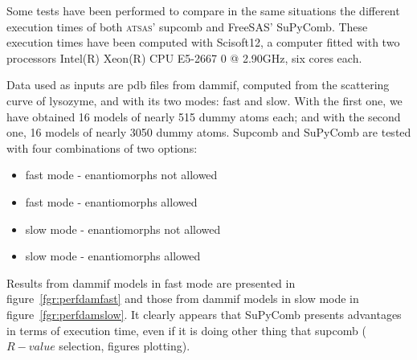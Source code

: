 \documentclass[a4paper, 11pt]{report}
\begin{document}
Some tests have been performed to compare in the same situations the 
different execution times of both \textsc{atsas}' supcomb and FreeSAS' 
SuPyComb. 
These execution times have been computed with Scisoft12, a computer 
fitted with two processors Intel(R) Xeon(R) CPU E5-2667 0 @ 2.90GHz, 
six cores each.

Data used as inputs are pdb files from dammif, computed from the 
scattering curve of lysozyme, and with its two modes: fast and slow. 
With the first one, we have obtained 16 models of nearly 515 dummy 
atoms each; and with the second one, 16 models of nearly 3050 dummy 
atoms. 
Supcomb and SuPyComb are tested with four combinations of two options: 
\begin{itemize}
\item fast mode - enantiomorphs not allowed
\item fast mode - enantiomorphs allowed
\item slow mode - enantiomorphs not allowed
\item slow mode - enantiomorphs allowed
\end{itemize}

Results from dammif models in fast mode are presented in 
figure~\ref{fgr:perfdamfast} and those from dammif models in slow mode 
in figure~\ref{fgr:perfdamslow}. 
It clearly appears that SuPyComb presents advantages in terms of 
execution time, even if it is doing other thing that supcomb 
($R-value$ selection, figures plotting).
\end{document}
